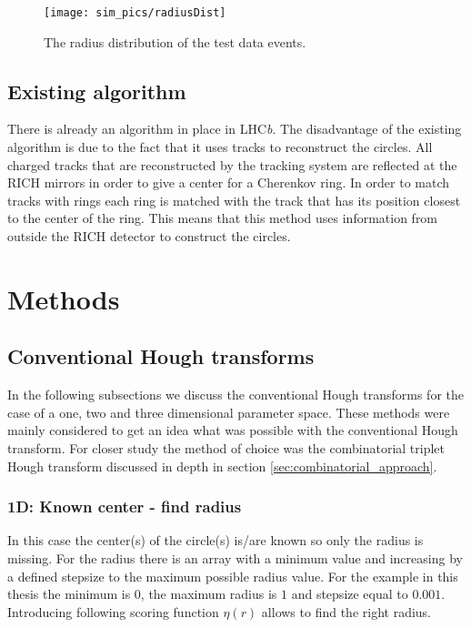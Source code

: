 \documentclass[11pt,twoside]{scrreprt}
\begin{document}
\begin{figure}[tb]
  \centering
  \texttt{[image: sim\_pics/radiusDist]}
  \caption{The radius distribution of the test data events.}
  \label{fig:radius_dist}
\end{figure}

\section{Existing algorithm} %
\label{sub:existing_algorithm}
There is already an algorithm in place in LHC\textit{b}. The disadvantage of the existing algorithm is due to the fact that it
uses tracks to reconstruct the circles. All charged tracks that are reconstructed by the tracking system are reflected at
the RICH mirrors in order to give a center for a Cherenkov ring. In order to match tracks with rings each ring is matched
with the track that has its position closest to the center of the ring. This means that this method uses information from
outside the RICH detector to construct the circles.


\chapter{Methods}

\section{Conventional Hough transforms} %
\label{sec:conventional_hough_transforms}

In the following subsections we discuss the conventional Hough transforms for the case of a one, two and three dimensional parameter space. These
methods were mainly considered to get an idea what was possible with the conventional Hough transform. For closer study the method of choice was
the combinatorial triplet Hough transform discussed in depth in section \ref{sec:combinatorial_approach}.

\subsection{1D: Known center - find radius} %
\label{sub:1d_known_center_find_radius}

In this case the center(s) of the circle(s) is/are known so only the radius is missing. For the radius there is an array with a minimum value
and increasing by a defined stepsize to the maximum possible radius value. For the example in this thesis the minimum is $0$, the maximum radius
is $1$ and stepsize equal to $0.001$. Introducing following scoring function $\eta(r)$ allows to find the right radius.
\end{document}
